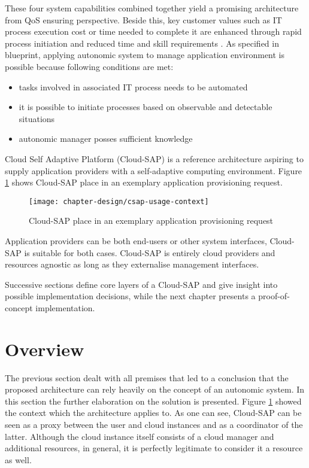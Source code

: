 These four system capabilities combined together yield a promising architecture from QoS ensuring perspective. Beside this, key customer values such as IT process execution cost or time needed to complete it are enhanced through rapid process initiation and reduced time and skill requirements \cite{IBM06}. As specified in blueprint, applying autonomic system to manage application environment is possible because following conditions are met:
\begin{itemize}
  \item tasks involved in associated IT process needs to be automated
  \item it is possible to initiate processes based on observable and detectable situations
  \item autonomic manager posses sufficient knowledge
\end{itemize}

Cloud Self Adaptive Platform (Cloud-SAP) is a reference architecture aspiring to supply application providers with a self-adaptive computing environment. Figure \ref{img:csap-usage-context} shows Cloud-SAP place in an exemplary application provisioning request. 
\begin{figure}[!ht]
  \begin{center}
    \texttt{[image: chapter-design/csap-usage-context]}
  \end{center}
  \caption{Cloud-SAP place in an exemplary application provisioning request}
  \label{img:csap-usage-context}
\end{figure}

Application providers can be both end-users or other system interfaces, Cloud-SAP is suitable for both cases. Cloud-SAP is entirely cloud providers and resources agnostic as long as they externalise management interfaces.

Successive sections define core layers of a Cloud-SAP and give insight into possible implementation decisions, while the next chapter presents a proof-of-concept implementation.

\section{Overview}
The previous section dealt with all premises that led to a conclusion that the proposed architecture can rely heavily on the concept of an autonomic system. In this section the further elaboration on the solution is presented.
Figure \ref{img:csap-usage-context} showed the context which the architecture applies to. As one can see, Cloud-SAP can be seen as a proxy between the user and cloud instances and as a coordinator of the latter. Although the cloud instance itself consists of a cloud manager and additional resources, in general, it is perfectly legitimate to consider it a resource as well. 

